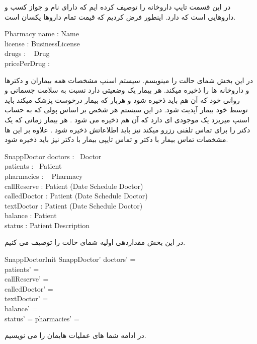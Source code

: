 \documentclass{article}
\begin{document}
در این قسمت تایپ داروخانه را توصیف کرده ایم که دارای نام و جواز کسب و داروهایی است که دارد. اینطور فرض کردیم که قیمت تمام داروها یکسان است.
\begin{schema}{Pharmacy}
name : Name\\
license : BusinessLicense\\
drugs : \power~ Drug\\
pricePerDrug : \nat
\end{schema}

در این بخش شمای حالت را مینویسم. سیستم اسنپ مشخصات همه بیماران و دکترها و داروخانه ها را ذخیره میکند. هر بیمار یک وضعیتی دارد نسبت به سلامت جسمانی و روانی خود که آن هم باید ذخیره شود و هربار که بیمار درخوست پزشک میکند باید توسط خود بیمار آپدیت شود. در این سیستم هر شخص بر اساس پولی که به حساب اسنپ میریزد یک موجودی ای دارد که آن هم ذخیره می شود . هر بیمار زمانی که یک دکتر را برای تماس تلفنی رزرو میکند نیز باید اطلاعاتش ذخیره شود . علاوه بر این ها مشخصات تماس بیمار با دکتر و تماس تایپی بیمار با دکتر نیز باید ذخیره شود. 
\begin{schema}{SnappDoctor}
doctors : \power~Doctor\\
patients : \power~Patient\\
pharmacies : \power~ Pharmacy\\
callReserve : Patient \fun \power(Date \cross Schedule \cross Doctor)\\
calledDoctor : Patient \fun \power(Date \cross Schedule \cross Doctor)\\
textDoctor : Patient \fun \power(Date \cross Schedule \cross Doctor)\\
balance : Patient \fun \nat\\
status : Patient \fun Description
\end{schema}

در این بخش مقداردهی اولیه شمای حالت را توصیف می کنیم.
\begin{schema}{SnappDoctorInit}
SnappDoctor'
\where
doctors' = \emptyset\\
patients' = \emptyset\\
callReserve' = \emptyset\\
calledDoctor' = \emptyset\\
textDoctor' = \emptyset\\
balance' = \emptyset\\
status' = \emptyset
pharmacies' = \emptyset
\end{schema}

در ادامه شما های عملیات هایمان را می نویسیم.
\\
\\
\\
\end{document}
